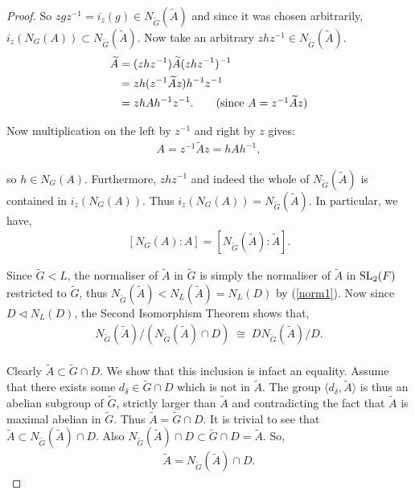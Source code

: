 \begin{proof}
  So $z g z^{-1} = i_z(g) \in N_{\widetilde{G}}({\widetilde{A}})$ and since it was chosen arbitrarily, $i_z(N_G(A)) \subset N_{\widetilde{G}}({\widetilde{A}})$. Now take an arbitrary $z h z^{-1} \in N_{\widetilde{G}}({\widetilde{A}})$.
  \begin{align*} {\widetilde{A}} &= (z h z^{-1}) {\widetilde{A}} (z h z^{-1})^{-1}
  \\ &= z h (z^{-1} {\widetilde{A}} z) h^{-1} z^{-1}
  \\ &= z h A h^{-1} z^{-1}. \tag{since $A = z^{-1} {\widetilde{A}} z$}
  \end{align*}
  
  Now multiplication on the left by $z^{-1}$ and right by $z$ gives:
  \begin{align*} A = z^{-1} {\widetilde{A}} z = h A h^{-1},
  \end{align*}
  
  so $h \in N_G(A)$. Furthermore, $z h z^{-1}$ and indeed the whole of $N_{\widetilde{G}}({\widetilde{A}})$ is contained in $i_z(N_G(A))$. Thus $ i_z(N_G(A)) = N_{\widetilde{G}}({\widetilde{A}})$. In particular, we have,
  \begin{align}\label{6.8iv1} [N_G(A): A] = [N_{\widetilde{G}}({\widetilde{A}}): {\widetilde{A}}].
  \end{align}
  
  Since ${\widetilde{G}} < L$, the normaliser of ${\widetilde{A}}$ in ${\widetilde{G}}$ is simply the normaliser of ${\widetilde{A}}$ in $\operatorname{SL}_2(F)$ restricted to ${\widetilde{G}}$, thus $N_{\widetilde{G}}({\widetilde{A}}) < N_L({\widetilde{A}}) = N_L(D)$ by (\ref{norm1}). Now since $D \vartriangleleft N_L(D)$, the Second Isomorphism Theorem shows that,
  \begin{align}\label{2iso} N_{\widetilde{G}}({\widetilde{A}})/( N_{\widetilde{G}}({\widetilde{A}}) \cap D) \; \cong \; DN_{\widetilde{G}}({\widetilde{A}}) / D.
  \end{align}
  \\
  Clearly ${\widetilde{A}} \subset {\widetilde{G}} \cap D$. We show that this inclusion is infact an equality. Assume that there exists some $d_\delta \in  {\widetilde{G}} \cap D$ which is not in ${\widetilde{A}}$. The group $\langle d_\delta , {\widetilde{A}} \rangle$ is thus an abelian subgroup of ${\widetilde{G}}$, strictly larger than ${\widetilde{A}}$ and contradicting the fact that ${\widetilde{A}}$ is maximal abelian in ${\widetilde{G}}$. Thus ${\widetilde{A}} =  {\widetilde{G}} \cap D$. It is trivial to see that ${\widetilde{A}} \subset N_{\widetilde{G}}({\widetilde{A}}) \cap D$. Also $N_{\widetilde{G}}({\widetilde{A}}) \cap D \subset {\widetilde{G}} \cap D = {\widetilde{A}}$. So,
  \begin{align}\label{parti} {\widetilde{A}} =  N_{\widetilde{G}}({\widetilde{A}}) \cap D.
  \end{align}
  

\end{proof}
